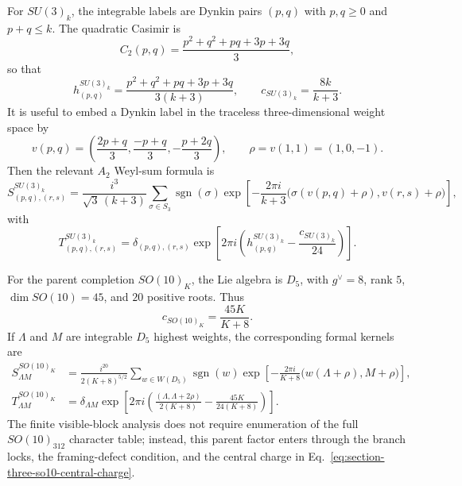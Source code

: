 \documentclass[11pt,letterpaper]{article}
\theoremstyle{plain}
\DeclareMathOperator{\dimop}{dim}
\begin{document}
For $SU(3)_k$, the integrable labels are Dynkin pairs
$(p,q)$ with $p,q\ge0$ and $p+q\le k$.  The quadratic Casimir is
\begin{equation}
\label{eq:section-three-su3-casimir}
 C_2(p,q)
 =
 \frac{p^2+q^2+pq+3p+3q}{3},
\end{equation}
so that
\begin{equation}
\label{eq:section-three-su3-weight}
 h^{SU(3)_k}_{(p,q)}
 =
 \frac{p^2+q^2+pq+3p+3q}{3(k+3)},
 \qquad
 c_{SU(3)_k}=\frac{8k}{k+3}.
\end{equation}
It is useful to embed a Dynkin label in the traceless three-dimensional weight
space by
\begin{equation}
\label{eq:section-three-su3-vector-map}
 v(p,q)
 =
 \left(\frac{2p+q}{3},\frac{-p+q}{3},-\frac{p+2q}{3}\right),
 \qquad
 \rho=v(1,1)=(1,0,-1).
\end{equation}
Then the relevant $A_2$ Weyl-sum formula is
\begin{equation}
\label{eq:section-three-su3-s}
 S^{SU(3)_k}_{(p,q),(r,s)}
 =
 \frac{i^3}{\sqrt3\,(k+3)}
 \sum_{\sigma\in S_3}\operatorname{sgn}(\sigma)
 \exp\!\left[
 -\frac{2\pi i}{k+3}
 \bigl(\sigma(v(p,q)+\rho),v(r,s)+\rho\bigr)
 \right],
\end{equation}
with
\begin{equation}
\label{eq:section-three-su3-t}
 T^{SU(3)_k}_{(p,q),(r,s)}
 =
 \delta_{(p,q),(r,s)}
 \exp\!\left[2\pi i\left(h^{SU(3)_k}_{(p,q)}
 -\frac{c_{SU(3)_k}}{24}\right)\right].
\end{equation}

For the parent completion $SO(10)_K$, the Lie algebra is $D_5$, with
$g^{\vee}=8$, rank $5$, $\dimop SO(10)=45$, and $20$ positive roots.  Thus
\begin{equation}
\label{eq:section-three-so10-central-charge}
 c_{SO(10)_K}=\frac{45K}{K+8}.
\end{equation}
If $\Lambda$ and $M$ are integrable $D_5$ highest weights, the corresponding
formal kernels are
\begin{align}
\label{eq:section-three-so10-kernels}
 S^{SO(10)_K}_{\Lambda M}
 &=
 \frac{i^{20}}{2(K+8)^{5/2}}
 \sum_{w\in W(D_5)}\operatorname{sgn}(w)
 \exp\!\left[-\frac{2\pi i}{K+8}
 \bigl(w(\Lambda+\rho),M+\rho\bigr)\right],\nonumber\\
 T^{SO(10)_K}_{\Lambda M}
 &=
 \delta_{\Lambda M}
 \exp\!\left[2\pi i\left(
 \frac{(\Lambda,\Lambda+2\rho)}{2(K+8)}
 -\frac{45K}{24(K+8)}
 \right)\right].
\end{align}
The finite visible-block analysis does not require enumeration of the full
$SO(10)_{312}$ character table; instead, this parent factor enters through the
branch locks, the framing-defect condition, and the central charge in
Eq.~\eqref{eq:section-three-so10-central-charge}.
\end{document}
